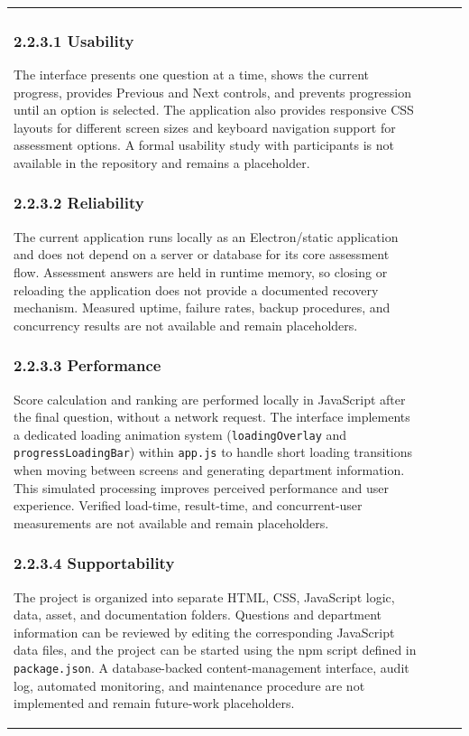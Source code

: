 \documentclass[12pt, a4paper]{article}
\begin{document}
\begin{itemize}[leftmargin=1.5em, itemsep=3pt]
\begin{table}[H]
\begin{tabularx}{\textwidth}{>{\raggedright\arraybackslash}p{0.8cm}>{\raggedright\arraybackslash}p{3.5cm}>{\raggedright\arraybackslash}X>{\raggedright\arraybackslash}p{2.5cm}}
\subsubsection*{2.2.3.1 Usability}

The interface presents one question at a time, shows the current progress, provides Previous and Next controls, and prevents progression until an option is selected. The application also provides responsive CSS layouts for different screen sizes and keyboard navigation support for assessment options. A formal usability study with participants is not available in the repository and remains a placeholder.

\subsubsection*{2.2.3.2 Reliability}

The current application runs locally as an Electron/static application and does not depend on a server or database for its core assessment flow. Assessment answers are held in runtime memory, so closing or reloading the application does not provide a documented recovery mechanism. Measured uptime, failure rates, backup procedures, and concurrency results are not available and remain placeholders.

\subsubsection*{2.2.3.3 Performance}

Score calculation and ranking are performed locally in JavaScript after the final question, without a network request. The interface implements a dedicated loading animation system (\texttt{loadingOverlay} and \texttt{progressLoadingBar}) within \texttt{app.js} to handle short loading transitions when moving between screens and generating department information. This simulated processing improves perceived performance and user experience. Verified load-time, result-time, and concurrent-user measurements are not available and remain placeholders.

\subsubsection*{2.2.3.4 Supportability}

The project is organized into separate HTML, CSS, JavaScript logic, data, asset, and documentation folders. Questions and department information can be reviewed by editing the corresponding JavaScript data files, and the project can be started using the npm script defined in \texttt{package.json}. A database-backed content-management interface, audit log, automated monitoring, and maintenance procedure are not implemented and remain future-work placeholders.


\end{tabularx}
\end{table}
\end{itemize}
\end{document}
